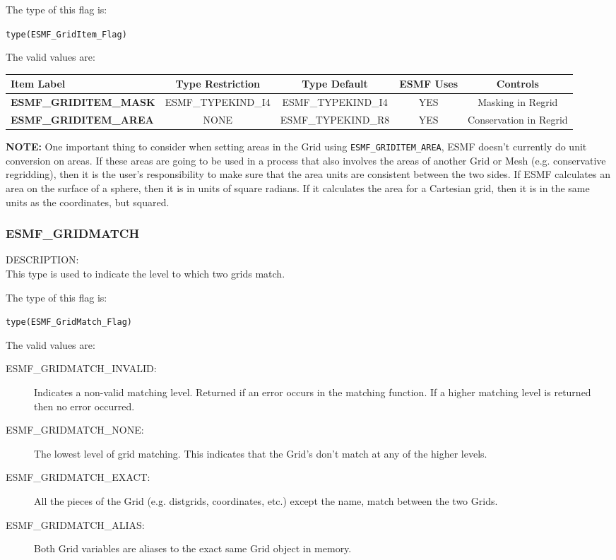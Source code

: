 The type of this flag is:

{\tt type(ESMF\_GridItem\_Flag)}

The valid values are:
\newline
\begin{tabular}{|l|c|c|c|c||}
\hline
\hline
Item Label & {\bf Type Restriction}  & {\bf Type Default} & {\bf ESMF Uses} & {\bf Controls} \\
\hline
{\bf ESMF\_GRIDITEM\_MASK}  & ESMF\_TYPEKIND\_I4 & ESMF\_TYPEKIND\_I4 & YES & Masking in Regrid \\
{\bf ESMF\_GRIDITEM\_AREA} & NONE & ESMF\_TYPEKIND\_R8 & YES & Conservation in Regrid \\
\hline
\hline
\end{tabular}

\medskip

 {\bf NOTE:} One important thing to consider when setting areas in the Grid using {\tt ESMF\_GRIDITEM\_AREA},
  ESMF doesn't currently do unit conversion on areas. If these areas are going to be used
 in a process that also involves the areas of another Grid or Mesh (e.g. conservative regridding), then
 it is the user's responsibility to make sure that the area units are consistent between the two sides.
 If ESMF calculates an area on the surface of a sphere, then it is in units of square radians. If 
 it calculates the area for a Cartesian grid, then it is in the same units as the coordinates, but squared. 


\subsubsection{ESMF\_GRIDMATCH}
\label{const:gridmatch}

{\sf DESCRIPTION:\\}
 This type is used to indicate the level to which two grids match.

The type of this flag is:

{\tt type(ESMF\_GridMatch\_Flag)}

The valid values are:
\begin{description}
\item [ESMF\_GRIDMATCH\_INVALID:] Indicates a non-valid matching level. Returned
      if an error occurs in the matching function. If a higher matching level
      is returned then no error occurred.
\item [ESMF\_GRIDMATCH\_NONE:] The lowest level of grid matching. 
      This indicates that the Grid's don't match at any of the higher levels. 
\item [ESMF\_GRIDMATCH\_EXACT:] All the pieces of the Grid (e.g. distgrids, 
      coordinates, etc.) except the name, match between the two Grids. 
\item [ESMF\_GRIDMATCH\_ALIAS:] Both Grid variables are aliases to the exact
      same Grid object in memory. 
\end{description}


